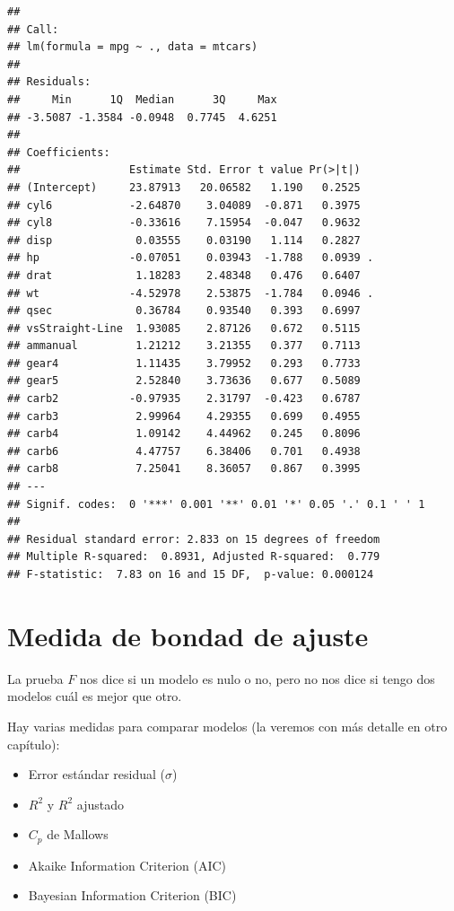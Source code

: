 \documentclass[
  12pt,
]{book}
\providecommand{\tightlist}{%
  \setlength{\itemsep}{0pt}\setlength{\parskip}{0pt}}
\theoremstyle{definition}
\theoremstyle{definition}
\theoremstyle{definition}
\theoremstyle{remark}
\begin{document}
\begin{verbatim}
## 
## Call:
## lm(formula = mpg ~ ., data = mtcars)
## 
## Residuals:
##     Min      1Q  Median      3Q     Max 
## -3.5087 -1.3584 -0.0948  0.7745  4.6251 
## 
## Coefficients:
##                 Estimate Std. Error t value Pr(>|t|)  
## (Intercept)     23.87913   20.06582   1.190   0.2525  
## cyl6            -2.64870    3.04089  -0.871   0.3975  
## cyl8            -0.33616    7.15954  -0.047   0.9632  
## disp             0.03555    0.03190   1.114   0.2827  
## hp              -0.07051    0.03943  -1.788   0.0939 .
## drat             1.18283    2.48348   0.476   0.6407  
## wt              -4.52978    2.53875  -1.784   0.0946 .
## qsec             0.36784    0.93540   0.393   0.6997  
## vsStraight-Line  1.93085    2.87126   0.672   0.5115  
## ammanual         1.21212    3.21355   0.377   0.7113  
## gear4            1.11435    3.79952   0.293   0.7733  
## gear5            2.52840    3.73636   0.677   0.5089  
## carb2           -0.97935    2.31797  -0.423   0.6787  
## carb3            2.99964    4.29355   0.699   0.4955  
## carb4            1.09142    4.44962   0.245   0.8096  
## carb6            4.47757    6.38406   0.701   0.4938  
## carb8            7.25041    8.36057   0.867   0.3995  
## ---
## Signif. codes:  0 '***' 0.001 '**' 0.01 '*' 0.05 '.' 0.1 ' ' 1
## 
## Residual standard error: 2.833 on 15 degrees of freedom
## Multiple R-squared:  0.8931, Adjusted R-squared:  0.779 
## F-statistic:  7.83 on 16 and 15 DF,  p-value: 0.000124
\end{verbatim}

\hypertarget{medida-de-bondad-de-ajuste}{%
\section{Medida de bondad de ajuste}\label{medida-de-bondad-de-ajuste}}

La prueba \(F\) nos dice si un modelo es nulo o no, pero no nos dice si tengo dos modelos cuál es mejor que otro.

Hay varias medidas para comparar modelos (la veremos con más detalle en otro capítulo):

\begin{itemize}
\tightlist
\item
  Error estándar residual (\(\sigma\))
\item
  \(R^{2}\) y \(R^{2}\) ajustado
\item
  \(C_{p}\) de Mallows
\item
  Akaike Information Criterion (AIC)
\item
  Bayesian Information Criterion (BIC)
\end{itemize}
\end{document}
